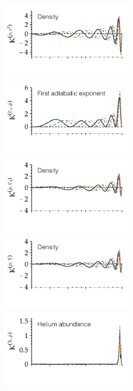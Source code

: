 {\begin{figure}
    \includegraphics[width=0.5\textwidth,trim={0 1.1cm 0 0}, clip]{figs/pulse/kernels/kernel-ell-rho_c2-diffusion.pdf}\\
    \includegraphics[width=0.5\textwidth,trim={0 1.1cm 0 0}, clip]{figs/pulse/kernels/kernel-ell-Gamma1_rho-diffusion.pdf}%
    \includegraphics[width=0.5\textwidth,trim={0 1.1cm 0 0}, clip]{figs/pulse/kernels/kernel-ell-rho_Gamma1-diffusion.pdf}\\
    \includegraphics[width=0.5\textwidth,trim={0 1.1cm 0 0}, clip]{figs/pulse/kernels/kernel-ell-rho_Y-diffusion.pdf}%
    \includegraphics[width=0.5\textwidth,trim={0 1.1cm 0 0}, clip]{figs/pulse/kernels/kernel-ell-Y_rho-diffusion.pdf}\\

\end{figure}}
